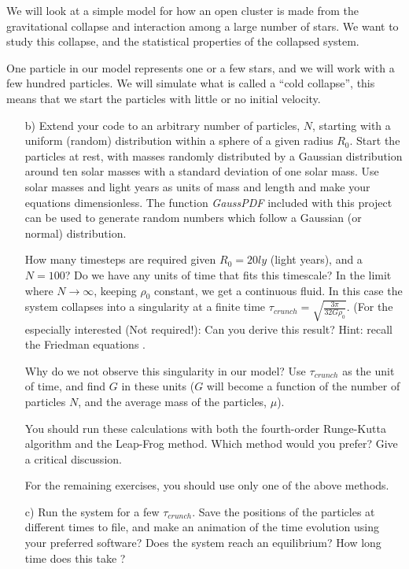 \documentclass[10pt]{article}
\begin{document}
We will look at a simple model for how an open cluster is made from
the gravitational collapse and interaction among a large number of
stars. We want to study this collapse, and the statistical properties
of the collapsed system.

One particle in our model represents one or a few stars, and we will
work with a few hundred particles. We will simulate what is called a
``cold collapse'', this means that we start the particles with little
or no initial velocity.
\begin{enumerate}
\item[b)] Extend your code to an arbitrary number of particles, $N$,
  starting with a uniform (random) distribution within a sphere of a
  given radius $R_0$. Start the particles at rest, with masses
  randomly distributed by a Gaussian distribution around ten solar
  masses with a standard deviation of one solar mass. Use solar masses
  and light years as units of mass and length and make your equations dimensionless.
The function {\em GaussPDF} included with this project can be used to generate 
random numbers which follow a Gaussian (or normal) distribution.

How many timesteps are required given $R_0 = 20 ly$
(light years), and a $N = 100$? Do we have any units of time that fits
this timescale?   
In the limit where $N \rightarrow \infty$, keeping $\rho_0$ constant,
we get a continuous fluid. In this case the system collapses into a
singularity at a finite time $\tau_{crunch} = \sqrt{\frac{3\pi}{32G\rho_0}}$. 
(For the especially interested (Not required!): Can
you derive this result? Hint: recall the Friedman equations \cite{friedmaneqs}.

Why do we not observe this singularity in our model? Use
$\tau_{crunch}$ as the unit of time, and find $G$ in these units ($G$
will become a function of the number of particles $N$, and the average
mass of the particles, $\mu$).

You should run these calculations with both the fourth-order Runge-Kutta algorithm
and the Leap-Frog method. Which method would you prefer? Give a critical discussion.

For the remaining exercises, you should use only one of the above methods. 

\item[c)] Run the system for a few $\tau_{crunch}$. Save the positions
  of the particles at different times to file, and make an animation
  of the time evolution using your preferred software? Does the system
  reach an equilibrium? How long time does this take ?


\end{enumerate}
\end{document}
